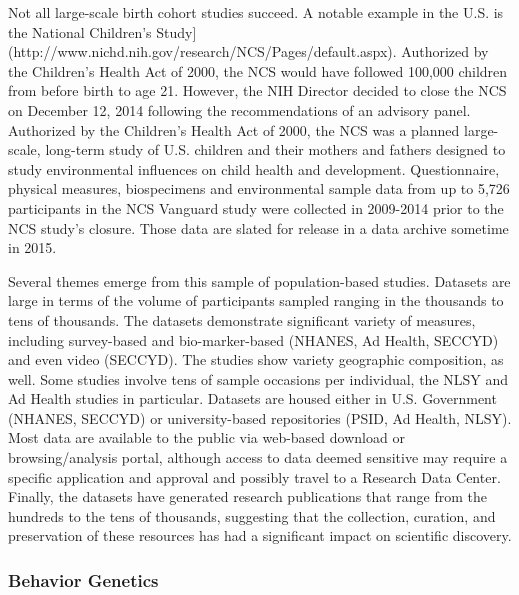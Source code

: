 \documentclass[letterpaper,man,apacite]{apa6}
\begin{document}
Not all large-scale birth cohort studies succeed.
A notable example in the U.S. is the National Children's Study](http://www.nichd.nih.gov/research/NCS/Pages/default.aspx).
Authorized by the Children's Health Act of 2000, the NCS would have followed 100,000 children from before birth to age 21. 
However, the NIH Director decided to close the NCS on December 12, 2014 following the recommendations of an advisory panel.
Authorized by the Children’s Health Act of 2000, the NCS was a planned large-scale, long-term study of U.S. children and their mothers and fathers designed to study environmental influences on child health and development. 
Questionnaire, physical measures, biospecimens and environmental sample data from up to 5,726 participants in the NCS Vanguard study were collected in 2009-2014 prior to the NCS study's closure.
Those data are slated for release in a data archive sometime in 2015. 

Several themes emerge from this sample of population-based studies.
Datasets are large in terms of the volume of participants sampled ranging in the thousands to tens of thousands.
The datasets demonstrate significant variety of measures, including survey-based and bio-marker-based (NHANES, Ad Health, SECCYD) and even video (SECCYD).
The studies show variety geographic composition, as well.
Some studies involve tens of sample occasions per individual, the NLSY and Ad Health studies in particular.
Datasets are housed either in U.S. Government (NHANES, SECCYD) or university-based repositories (PSID, Ad Health, NLSY).
Most data are available to the public via web-based download or browsing/analysis portal, although access to data deemed sensitive may require a specific application and approval and possibly travel to a Research Data Center.
Finally, the datasets have generated research publications that range from the hundreds to the tens of thousands, suggesting that the collection, curation, and preservation of these resources has had a significant impact on scientific discovery.

\subsubsection{Behavior Genetics}
\end{document}
